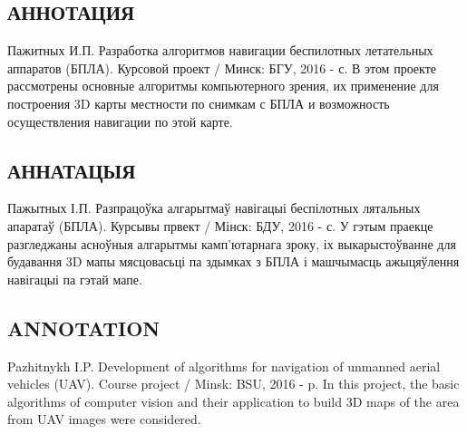 \begin{center}
     \section*{АННОТАЦИЯ}
\end{center}
Пажитных И.П. Разработка алгоритмов навигации беспилотных летательных аппаратов (БПЛА). Курсовой проект / Минск: БГУ, 2016 - \pageref{LastPage} с.
В этом проекте рассмотрены основные алгоритмы компьютерного зрения, их применение для построения 3D карты местности по снимкам с БПЛА и возможность осуществления навигации по этой карте.
\vspace{1em}
\begin{center}
     \section*{АННАТАЦЫЯ}
\end{center}
Пажытных І.П. Разпрацоўка алгарытмаў навігацыі беспілотных лятальных апаратаў (БПЛА). Курсывы првект / Мінск: БДУ, 2016 - \pageref{LastPage} с.
У гэтым праекце разгледжаны асноўныя алгарытмы камп'ютарнага зроку, іх выкарыстоўванне для будавання 3D мапы мясцовасьці па здымках з БПЛА і машчымасць ажыцяўлення навігацыі па гэтай мапе.
\begin{center}
     \section*{ANNOTATION}
\end{center}
Pazhitnykh I.P. Development of algorithms for navigation of unmanned aerial vehicles (UAV). Course project / Minsk: BSU, 2016 - \pageref{LastPage} p.
In this project, the basic algorithms of computer vision and their application to build 3D maps of the area from UAV images were considered. 
\newpage